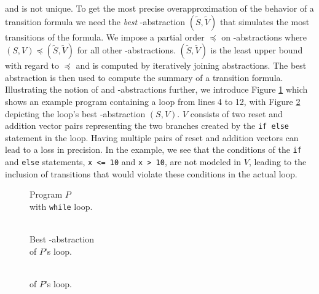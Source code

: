 and is not unique. To get the most precise overapproximation of the behavior of a transition formula we need the \textsl{best} \qvasr-abstraction $(\tilde{S}, \tilde{V})$ that simulates the most transitions of the formula. We impose a partial order $\preceq$ on \qvasr-abstractions where $(S, V) \preceq (\tilde{S}, \tilde{V})$ for all other \qvasr-abstractions. $(\tilde{S}, \tilde{V})$ is the least upper bound with regard to $\preceq$ and is computed by iteratively joining abstractions. The best abstraction is then used to compute the summary of a transition formula. \\ Illustrating the notion of \qvasr and \qvasr-abstractions further, we introduce Figure \ref{code} which shows an example program containing a loop from lines 4 to 12, with Figure \ref{vasr} depicting the loop's best \qvasr-abstraction $(S,V)$. $V$ consists of two reset and addition vector pairs representing the two branches created by the \texttt{if else} statement in the loop. Having multiple pairs of reset and addition vectors can lead to a loss in precision. In the example, we see that the conditions of the \texttt{if} and \texttt{else} statements, \texttt{x <= 10} and \texttt{x > 10}, are not modeled in $V$, leading to the inclusion of transitions that would violate these conditions in the actual loop. \\
\begin{minipage}[t]{0.3\linewidth} \centering
	\begin{figure}[H]
		
		\caption{Program $P$ \\ with \texttt{while} loop.}
		\label{code}
	\end{figure}
\end{minipage}
\begin{minipage}[t]{0.35\linewidth} \centering
	\begin{figure}[H]
			
			\caption{\\ Best \qvasr-abstraction \\ of $P$'s loop.}
			\label{vasr}
	\end{figure}
\end{minipage}
\begin{minipage}[t]{0.3\linewidth} \centering
	\begin{figure}[H]
		
		\caption{\\ \qvasrs of $P$'s loop.}
		\label{vasrs}
	\end{figure}
\end{minipage}
\vspace*{1cm}

